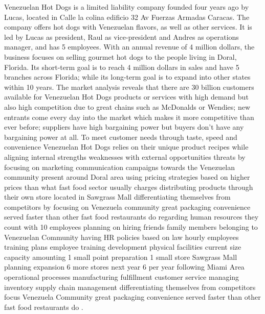 
Venezuelan Hot Dogs is a limited liability company founded four years ago by Lucas, located in Calle la colina edificio 32 Av Fuerzas Armadas Caracas. The company offers hot dogs with Venezuelan flavors, as well as other services. It is led by Lucas as president, Raul as vice-president and Andres as operations manager, and has 5 employees. With an annual revenue of 4 million dollars, the business focuses on selling gourmet hot dogs to the people living in Doral, Florida. Its short-term goal is to reach 4 million dollars in sales and have 5 branches across Florida; while its long-term goal is to expand into other states within 10 years. The market analysis reveals that there are 30 billion customers available for Venezuelan Hot Dogs products or services with high demand but also high competition due to great chains such as McDonalds or Wendies; new entrants come every day into the market which makes it more competitive than ever before; suppliers have high bargaining power but buyers don't have any bargaining power at all. To meet customer needs through taste, speed and convenience Venezuelan Hot Dogs relies on their unique product recipes while aligning internal strengths weaknesses with external opportunities threats by focusing on marketing communication campaigns towards the Venezuelan community present around Doral area using pricing strategies based on higher prices than what fast food sector usually charges distributing products through their own store located in Sawgrass Mall differentiating themselves from competitors by focusing on Venezuela community great packaging convenience served faster than other fast food restaurants do regarding human resources they count with 10 employees planning on hiring friends family members belonging to Venezuelan Community having HR policies based on law hourly employees training plans employee training development physical facilities current size capacity amounting 1 small point preparation 1 small store Sawgrass Mall planning expansion 6 more stores next year 6 per year following Miami Area operational processes manufacturing fulfillment customer service managing inventory supply chain management differentiating themselves from competitors focus Venezuela Community great packaging convenience served faster than other fast food restaurants do . 

